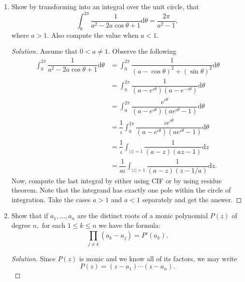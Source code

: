 \documentclass[12pt]{article}
\theoremstyle{definition}
\newenvironment{soln}{\begin{proof}[Solution]}{\end{proof}}
\begin{document}
\begin{enumerate}[leftmargin=*]
\begin{soln}
    	The final answer should come out to be $\boxed{\dfrac{2\pi}{e}}.$
    \end{soln}
    \item Show by transforming into an integral over the unit circle, that
    \begin{equation*} 
    	\int_{0}^{2\pi} \dfrac{1}{a^2 - 2a\cos\theta + 1} {\mathrm{d}}\theta = \dfrac{2\pi}{a^2 - 1},
    \end{equation*}
    where $a > 1.$ Also compute the value when $a < 1.$
    \begin{soln}
    	Assume that $0 < a \neq 1.$ Observe the following
    	\begin{align*} 
    		\int_{0}^{2\pi} \dfrac{1}{a^2 - 2a\cos\theta + 1} {\mathrm{d}}\theta &= \int_{0}^{2\pi} \dfrac{1}{(a - \cos\theta)^2 + (\sin \theta)^2} {\mathrm{d}}\theta\\
    		&= \int_{0}^{2\pi} \dfrac{1}{(a - e^{\iota\theta})(a - e^{-\iota\theta})} {\mathrm{d}}\theta\\
    		&= \int_{0}^{2\pi} \dfrac{e^{\iota\theta}}{(a - e^{\iota\theta})(ae^{\iota\theta} - 1)} {\mathrm{d}}\theta\\
    		&= \dfrac{1}{\iota}\int_{0}^{2\pi} \dfrac{\iota	e^{\iota\theta}}{(a - e^{\iota\theta})(ae^{\iota\theta} - 1)} {\mathrm{d}}\theta\\
    		&= \dfrac{1}{\iota}\int_{|z| = 1}^{} \dfrac{1}{(a - z)(az - 1)} {\mathrm{d}}z\\
    		&= \dfrac{1}{a\iota}\int_{|z| = 1}^{} \dfrac{1}{(a - z)(z - 1/a)} {\mathrm{d}}z.
    	\end{align*}
    	Now, compute the last integral by either using CIF or by using residue theorem. Note that the integrand has exactly one pole within the circle of integration. Take the cases $a > 1$ and $a < 1$ separately and get the answer.
    \end{soln}
    \item Show that if $a_1, \ldots, a_n$ are the distinct roots of a monic polynomial $P(z)$ of degree $n,$ for each $1 \le k \le n$  we have the formula:
    \begin{equation*} 
    	\prod_{j \neq k}^{}(a_k - a_j) = P'(a_k).
    \end{equation*}
    \begin{soln}
    	Since $P(z)$ is monic and we know all of its factors, we may write
    	\begin{equation*} 
    		P(z) = (z - a_1)\cdots(z - a_n).
    	\end{equation*}

\end{soln}
\end{enumerate}
\end{document}
